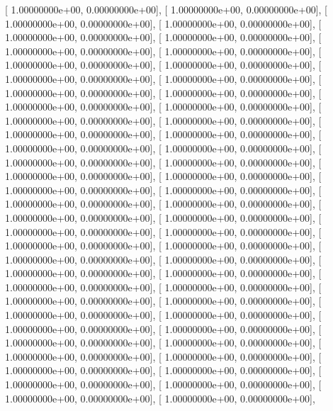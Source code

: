 \documentclass{article}
\begin{document}
       [  1.00000000e+00,   0.00000000e+00],
       [  1.00000000e+00,   0.00000000e+00],
       [  1.00000000e+00,   0.00000000e+00],
       [  1.00000000e+00,   0.00000000e+00],
       [  1.00000000e+00,   0.00000000e+00],
       [  1.00000000e+00,   0.00000000e+00],
       [  1.00000000e+00,   0.00000000e+00],
       [  1.00000000e+00,   0.00000000e+00],
       [  1.00000000e+00,   0.00000000e+00],
       [  1.00000000e+00,   0.00000000e+00],
       [  1.00000000e+00,   0.00000000e+00],
       [  1.00000000e+00,   0.00000000e+00],
       [  1.00000000e+00,   0.00000000e+00],
       [  1.00000000e+00,   0.00000000e+00],
       [  1.00000000e+00,   0.00000000e+00],
       [  1.00000000e+00,   0.00000000e+00],
       [  1.00000000e+00,   0.00000000e+00],
       [  1.00000000e+00,   0.00000000e+00],
       [  1.00000000e+00,   0.00000000e+00],
       [  1.00000000e+00,   0.00000000e+00],
       [  1.00000000e+00,   0.00000000e+00],
       [  1.00000000e+00,   0.00000000e+00],
       [  1.00000000e+00,   0.00000000e+00],
       [  1.00000000e+00,   0.00000000e+00],
       [  1.00000000e+00,   0.00000000e+00],
       [  1.00000000e+00,   0.00000000e+00],
       [  1.00000000e+00,   0.00000000e+00],
       [  1.00000000e+00,   0.00000000e+00],
       [  1.00000000e+00,   0.00000000e+00],
       [  1.00000000e+00,   0.00000000e+00],
       [  1.00000000e+00,   0.00000000e+00],
       [  1.00000000e+00,   0.00000000e+00],
       [  1.00000000e+00,   0.00000000e+00],
       [  1.00000000e+00,   0.00000000e+00],
       [  1.00000000e+00,   0.00000000e+00],
       [  1.00000000e+00,   0.00000000e+00],
       [  1.00000000e+00,   0.00000000e+00],
       [  1.00000000e+00,   0.00000000e+00],
       [  1.00000000e+00,   0.00000000e+00],
       [  1.00000000e+00,   0.00000000e+00],
       [  1.00000000e+00,   0.00000000e+00],
       [  1.00000000e+00,   0.00000000e+00],
       [  1.00000000e+00,   0.00000000e+00],
       [  1.00000000e+00,   0.00000000e+00],
       [  1.00000000e+00,   0.00000000e+00],
       [  1.00000000e+00,   0.00000000e+00],
       [  1.00000000e+00,   0.00000000e+00],
       [  1.00000000e+00,   0.00000000e+00],
       [  1.00000000e+00,   0.00000000e+00],
       [  1.00000000e+00,   0.00000000e+00],
       [  1.00000000e+00,   0.00000000e+00],
       [  1.00000000e+00,   0.00000000e+00],
       [  1.00000000e+00,   0.00000000e+00],
       [  1.00000000e+00,   0.00000000e+00],
       [  1.00000000e+00,   0.00000000e+00],
       [  1.00000000e+00,   0.00000000e+00],
       [  1.00000000e+00,   0.00000000e+00],
       [  1.00000000e+00,   0.00000000e+00],
\end{document}
